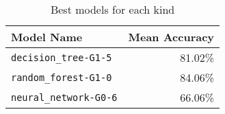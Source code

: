 \begin{table}[H]
\centering
\begin{tabularx}{0.48\textwidth}{|X|r|}
\hline
Model Name & Mean Accuracy \\
\hline
\texttt{decision\_tree-G1-5} & 81.02\% \\
\texttt{random\_forest-G1-0} & 84.06\% \\
\texttt{neural\_network-G0-6} & 66.06\% \\
\hline
\end{tabularx}
\caption{Best models for each kind}
\label{tab:best_model_per_kind}

\end{table}
